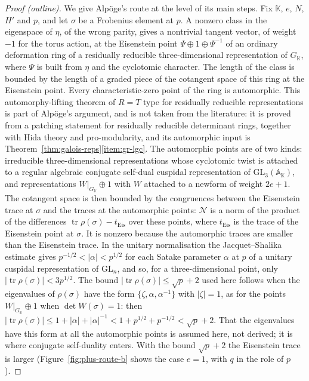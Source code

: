 \documentclass[11pt]{amsbook}
\theoremstyle{plain}
\theoremstyle{definition}
\theoremstyle{remark}
\numberwithin{equation}{section}
\numberwithin{figure}{chapter}
\numberwithin{table}{chapter}
\begin{document}
\begin{proof}[Proof (outline)]
We give Alp\"oge's route at the level of its main steps.
Fix $\mathbb K$, $e$, $N$, $H'$ and $p$, and let $\sigma$ be a
Frobenius element at $p$. A nonzero class in the eigenspace of $\eta$,
of the wrong parity, gives a nontrivial tangent vector, of weight $-1$
for the torus action, at the Eisenstein point $\Psi\oplus1\oplus
\Psi^{-1}$ of an ordinary deformation ring of a residually reducible
three-dimensional representation of $G_{\mathbb K}$, where $\Psi$ is
built from $\eta$ and the cyclotomic character. The length of the
class is bounded by the length of a graded piece of the cotangent space
of this ring at the Eisenstein point. Every characteristic-zero point
of the ring is automorphic. This automorphy-lifting theorem of $R=T$
type for residually reducible representations is part of Alp\"oge's
argument, and is not taken from the literature: it is proved from a
patching statement for residually reducible determinant rings,
together with Hida theory and pro-modularity, and its automorphic
input is Theorem~\ref{thm:galois-reps}\ref{item:gr-lgc}. The
automorphic points are of two
kinds: irreducible three-dimensional representations whose cyclotomic
twist is attached to a regular algebraic conjugate self-dual cuspidal
representation of $\mathrm{GL}_3(\mathbb A_{\mathbb K})$, and
representations $W|_{G_{\mathbb K}}\oplus1$ with $W$ attached to a
newform of weight $2e+1$. The cotangent space is then bounded by the
congruences between the Eisenstein trace at $\sigma$ and the traces at
the automorphic points: $\mathcal N$ is a norm of the product of
the differences $\operatorname{tr}\rho(\sigma)-t_{\mathrm{Eis}}$ over
these points, where $t_{\mathrm{Eis}}$ is the trace of the Eisenstein
point at $\sigma$. It is nonzero because the automorphic traces are
smaller than the Eisenstein trace. In the unitary normalisation the
Jacquet--Shalika estimate \cite{JacquetShalika1981} gives
$p^{-1/2}<|\alpha|<p^{1/2}$ for each Satake parameter $\alpha$ at $p$
of a unitary cuspidal representation of $\mathrm{GL}_n$, and so, for
a three-dimensional point, only $|\operatorname{tr}\rho(\sigma)|<
3p^{1/2}$. The bound $|\operatorname{tr}\rho(\sigma)|\le\sqrt p+2$
used here follows when the eigenvalues of $\rho(\sigma)$ have the form
$\{\zeta,\alpha,\alpha^{-1}\}$ with $|\zeta|=1$, as for the points
$W|_{G_{\mathbb K}}\oplus1$ when $\det W(\sigma)=1$: then
$|\operatorname{tr}\rho(\sigma)|\le1+|\alpha|+|\alpha|^{-1}<1+p^{1/2}
+p^{-1/2}<\sqrt p+2$. That the eigenvalues have this form at all the
automorphic points is assumed here, not derived; it is where
conjugate self-duality enters. With the bound $\sqrt p+2$ the
Eisenstein trace is larger (Figure~\ref{fig:plus-route-b} shows the
case $e=1$, with $q$ in the role of $p$).
\end{proof}
\end{document}
